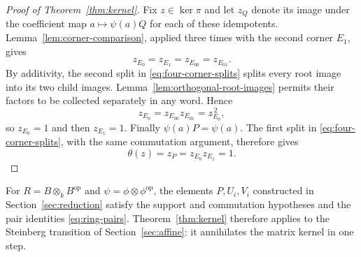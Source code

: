 \begin{proof}[Proof of Theorem~\ref{thm:kernel}]
Fix $z\in\ker\pi$ and let $z_Q$ denote its image under the
coefficient map $a\mapsto\psi(a)Q$ for each of these idempotents.
Lemma~\ref{lem:corner-comparison}, applied three times with the
second corner $E_1$, gives
\begin{equation}\label{eq:four-corner-equality}
 z_{E_0}=z_{E_1}=z_{E_{00}}=z_{E_{01}}.
\end{equation}
By additivity, the second split in \eqref{eq:four-corner-splits}
splits every root image into its two child images.
Lemma~\ref{lem:orthogonal-root-images} permits their factors to be
collected separately in any word.  Hence
\[
 z_{E_0}=z_{E_{00}}z_{E_{01}}=z_{E_0}^{\,2},
\]
so $z_{E_0}=1$ and then $z_{E_1}=1$.
Finally $\psi(a)P=\psi(a)$.  The first split in
\eqref{eq:four-corner-splits}, with the same commutation argument,
therefore gives
\[
 \theta(z)=z_P=z_{E_0}z_{E_1}=1.
\]
\end{proof}

For $R=B\otimes_k B^{\mathrm{op}}$ and
$\psi=\phi\otimes\phi^{\mathrm{op}}$, the elements $P,U_i,V_i$
constructed in Section~\ref{sec:reduction} satisfy the support and
commutation hypotheses and the pair identities \eqref{eq:ring-pairs}.
Theorem~\ref{thm:kernel} therefore applies to the Steinberg transition
of Section~\ref{sec:affine}: it annihilates the matrix kernel in one step.
